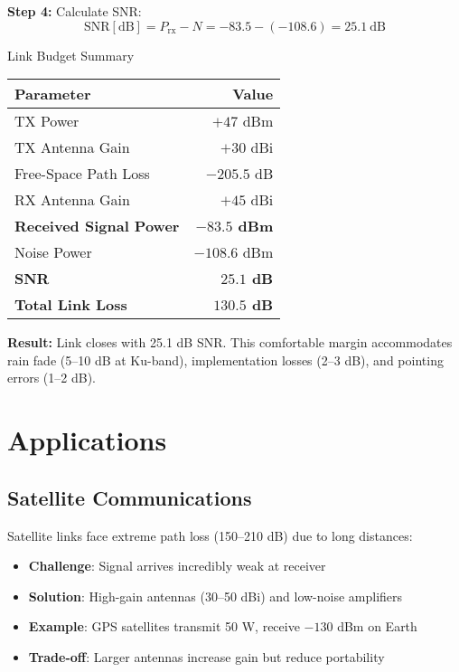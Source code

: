\textbf{Step 4:} Calculate SNR:
\begin{equation}
\text{SNR} [\text{dB}] = P_{\text{rx}} - N = -83.5 - (-108.6) = 25.1\ \text{dB}
\end{equation}

\begin{calloutbox}[colback=black!8!white,colframe=black]{Link Budget Summary}
\begin{tabular}{@{}lr@{}}
\toprule
\textbf{Parameter} & \textbf{Value} \\
\midrule
TX Power & $+47$ dBm \\
TX Antenna Gain & $+30$ dBi \\
Free-Space Path Loss & $-205.5$ dB \\
RX Antenna Gain & $+45$ dBi \\
\midrule
\textbf{Received Signal Power} & \textbf{$-83.5$ dBm} \\
Noise Power & $-108.6$ dBm \\
\midrule
\textbf{SNR} & \textbf{$25.1$ dB} \\
\textbf{Total Link Loss} & \textbf{$130.5$ dB} \\
\bottomrule
\end{tabular}

\textbf{Result:} Link closes with 25.1 dB SNR. This comfortable margin accommodates rain fade (5--10 dB at Ku-band), implementation losses (2--3 dB), and pointing errors (1--2 dB).
\end{calloutbox}

\section{Applications}

\subsection{Satellite Communications}

Satellite links face extreme path loss (150--210 dB) due to long distances:
\begin{itemize}
\item \textbf{Challenge}: Signal arrives incredibly weak at receiver
\item \textbf{Solution}: High-gain antennas (30--50 dBi) and low-noise amplifiers
\item \textbf{Example}: GPS satellites transmit 50 W, receive $-130$ dBm on Earth
\item \textbf{Trade-off}: Larger antennas increase gain but reduce portability
\end{itemize}

